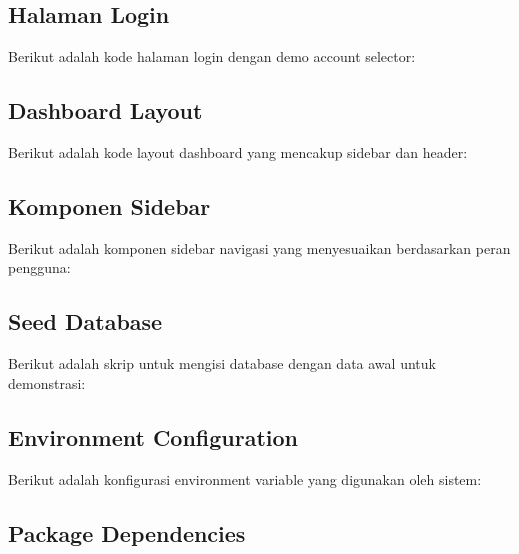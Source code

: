 \documentclass[12pt,a4paper,oneside]{report}
\begin{document}
\subsection{Halaman Login}

Berikut adalah kode halaman login dengan demo account selector:



\subsection{Dashboard Layout}

Berikut adalah kode layout dashboard yang mencakup sidebar dan header:



\subsection{Komponen Sidebar}

Berikut adalah komponen sidebar navigasi yang menyesuaikan berdasarkan peran pengguna:



\subsection{Seed Database}

Berikut adalah skrip untuk mengisi database dengan data awal untuk demonstrasi:



\subsection{Environment Configuration}

Berikut adalah konfigurasi environment variable yang digunakan oleh sistem:



\subsection{Package Dependencies}
\end{document}

